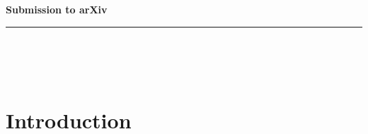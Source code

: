 \documentclass[]{acm_proc_article-sp}
\title{\papertitle}
\author{
Michael Stay\\
  \affaddr{Google}\\
  \email{\fontsize{8}{8}\selectfont stay@google.com}
\and
L.G. Meredith\\
  \affaddr{Biosimilarity, LLC}\\
  \email{\fontsize{8}{8}\selectfont lgreg.meredith@biosimilarity.com}
}
\numberwithin{equation}{subsection}
\newcommand{\pic}{$\pi$-calculus}
\newcommand{\paperversion}{Draft Version 0.1 - Jan 7, 2015}
\newenvironment{toc}
{
\begin{list}{}{
   \setlength{\leftmargin}{0.4in}
   \setlength{\rightmargin}{0.6in}
   \setlength{\parskip}{0pt}
 } \item }
{\end{list}}
\begin{document}
\lstset{language=}

\setlength{\topmargin}{0in}
\setlength{\textheight}{8.5in}
\setlength{\parskip}{6pt}


\begin{abstract}
\normalsize{ 

  We present an approach to modeling computational calculi using
  higher category theory. Specifically we present a fully abstract
  semantics for the {\pic}. The interpretation is consistent with
  Curry-Howard, interpreting terms as typed morphisms, while
  simultaneously providing an explicit interpretation of the rewrite
  rules of standard operational presentations as 2-morphisms. One of
  the key contributions is a method of restricting rewrites to
  specific contexts inspired by catalysis in chemical reactions.

}

\end{abstract}

\noindent
{\large \textbf{Submission to arXiv}}\\
\rule{6.25in}{0.75pt}\\\\\\

\maketitle




\section{Introduction}
\end{document}
